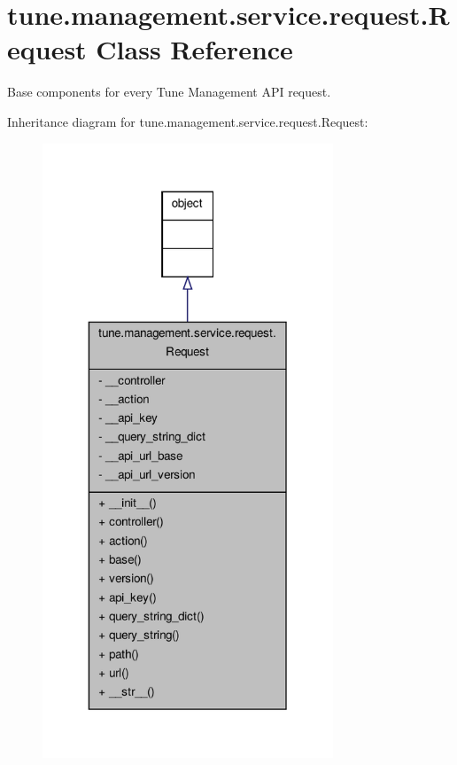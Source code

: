 \hypertarget{classtune_1_1management_1_1service_1_1request_1_1Request}{\section{tune.\-management.\-service.\-request.\-Request Class Reference}
\label{classtune_1_1management_1_1service_1_1request_1_1Request}
}


Base components for every Tune Management A\-P\-I request.  




Inheritance diagram for tune.\-management.\-service.\-request.\-Request\-:
\nopagebreak
\begin{figure}[H]
\begin{center}
\leavevmode
\includegraphics[width=246pt]{classtune_1_1management_1_1service_1_1request_1_1Request__inherit__graph}
\end{center}
\end{figure}


